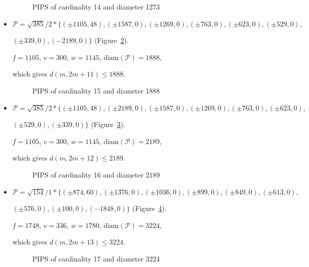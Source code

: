 \documentclass[12pt]{article}
\theoremstyle{theorem}
\theoremstyle{dfn}
\theoremstyle{remark}
\begin{document}
\begin{itemize}
\begin{figure}[h!]
\parbox{0.7\linewidth}{\caption{PIPS of cardinality 14 and diameter 1273}
\label{picture_7.png}}
\end{figure}


\item
$\mathcal{P}=\sqrt{385}/{2} * \{ (\pm 1105, 48),
(\pm 1587 , 0),
(\pm 1269 , 0),
(\pm 763 , 0),
(\pm 623 , 0),
(\pm 529 , 0),
$

$
(\pm 339 , 0),
(-2189 , 0)\}
$
(Figure~\ref{picture_8.png}).

$f = 1105$, $v = 300$, $w = 1145$, $\operatorname{diam(\mathcal{P})} = 1888$,

which gives $d(m, 2m + 11) \leq 1888$.


\begin{figure}[h!]
\parbox{0.75\linewidth}{\caption{PIPS of cardinality 15 and diameter 1888}
\label{picture_8.png}}
\end{figure}


\item
$\mathcal{P}=\sqrt{385}/{2} * \{ (\pm 1105, 48),
(\pm 2189 , 0),
(\pm 1587 , 0),
(\pm 1269 , 0),
(\pm 763 , 0),
(\pm 623 , 0),
$

$
(\pm 529 , 0),
(\pm 339 , 0)\}
$
(Figure~\ref{picture_9.png}).

$f = 1105$, $v = 300$, $w = 1145$, $\operatorname{diam(\mathcal{P})} = 2189$,

which gives $d(m, 2m + 12) \leq 2189$.


\begin{figure}[h!]
\parbox{0.75\linewidth}{\caption{PIPS of cardinality 16 and diameter 2189}
\label{picture_9.png}}
\end{figure}


\item
$\mathcal{P}=\sqrt{154}/{1} * \{ (\pm 874, 60),
(\pm 1376 , 0),
(\pm 1036 , 0),
(\pm 899 , 0),
(\pm 849 , 0),
(\pm 613 , 0),
$

$
(\pm 576 , 0),
(\pm 100 , 0),
(-1848 , 0)\}
$
(Figure~\ref{picture_13.png}).

$f = 1748$, $v = 336$, $w = 1780$, $\operatorname{diam(\mathcal{P})} = 3224$,

which gives $d(m, 2m + 13) \leq 3224$.


\begin{figure}[h!]
\parbox{0.85\linewidth}{\caption{PIPS of cardinality 17 and diameter 3224}
\label{picture_13.png}}
\end{figure}



\end{itemize}
\end{document}
